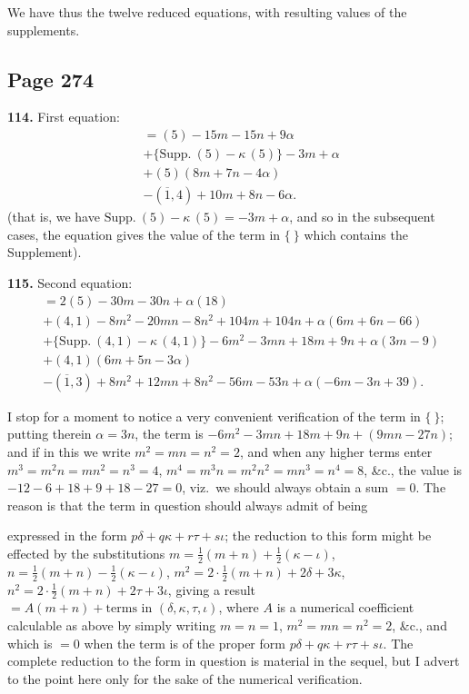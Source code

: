 \documentclass[11pt,a4paper]{article}
\theoremstyle{definition}
\begin{document}
We have thus the twelve reduced equations, with resulting values of the supplements.

\subsection*{Page 274}

\noindent\textbf{114.} First equation:
\begin{align*}
&= (5) - 15m - 15n + 9\alpha\\
&+ \{\text{Supp.}\ (5) - \kappa\,(5)\} - 3m + \alpha\\
&+ (5)(8m + 7n - 4\alpha)\\
&- (\overline{1},4) + 10m + 8n - 6\alpha.
\end{align*}
(that is, we have $\text{Supp.}\ (5) - \kappa\,(5) = -3m + \alpha$, and so in the subsequent cases, the equation gives the value of the term in $\{\ \}$ which contains the Supplement).

\medskip
\noindent\textbf{115.} Second equation:
\begin{align*}
&= 2(5) - 30m - 30n + \alpha(18)\\
&+ (4,1) - 8m^2 - 20mn - 8n^2 + 104m + 104n + \alpha(6m + 6n - 66)\\
&+ \{\text{Supp.}\ (4,1) - \kappa\,(4,1)\} - 6m^2 - 3mn + 18m + 9n + \alpha(3m - 9)\\
&+ (4,1)(6m + 5n - 3\alpha)\\
&- (\overline{1},3) + 8m^2 + 12mn + 8n^2 - 56m - 53n + \alpha(-6m - 3n + 39).
\end{align*}

I stop for a moment to notice a very convenient verification of the term in $\{\ \}$; putting therein $\alpha = 3n$, the term is $-6m^2 - 3mn + 18m + 9n + (9mn - 27n)$; and if in this we write $m^2 = mn = n^2 = 2$, and when any higher terms enter $m^3 = m^2n = mn^2 = n^3 = 4$, $m^4 = m^3n = m^2n^2 = mn^3 = n^4 = 8$, \&c., the value is $-12 - 6 + 18 + 9 + 18 - 27 = 0$, viz.\ we should always obtain a sum $= 0$. The reason is that the term in question should always admit of being


expressed in the form $p\delta + q\kappa + r\tau + s\iota$; the reduction to this form might be effected by the substitutions $m = \frac{1}{2}(m + n) + \frac{1}{2}(\kappa - \iota)$, $n = \frac{1}{2}(m + n) - \frac{1}{2}(\kappa - \iota)$, $m^2 = 2 \cdot \frac{1}{2}(m + n) + 2\delta + 3\kappa$, $n^2 = 2 \cdot \frac{1}{2}(m + n) + 2\tau + 3\iota$, giving a result $= A(m + n) + \text{terms in } (\delta, \kappa, \tau, \iota)$, where $A$ is a numerical coefficient calculable as above by simply writing $m = n = 1$, $m^2 = mn = n^2 = 2$, \&c., and which is $= 0$ when the term is of the proper form $p\delta + q\kappa + r\tau + s\iota$. The complete reduction to the form in question is material in the sequel, but I advert to the point here only for the sake of the numerical verification.
\end{document}
